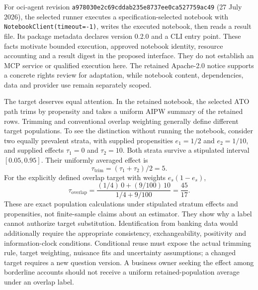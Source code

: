 For oci-agent revision
\texttt{a978030e2c69cddab235}\allowbreak\texttt{e8737ee0ca527759ac49}
(27 July 2026), the selected runner executes a specification-selected notebook
with \texttt{NotebookClient(timeout=-1)}, writes the executed notebook, then
reads a result file. Its package metadata declares version 0.2.0 and a CLI
entry point. These facts motivate bounded execution, approved notebook
identity, resource accounting and a result digest in the proposed interface.
They do not establish an MCP service or qualified execution here. The retained
Apache-2.0 notice supports a concrete rights review for adaptation, while
notebook content, dependencies, data and provider use remain separately
scoped.~\citep{exec13_data_oci_code,exec25_agents_choice}

The target deserves equal attention. In the retained notebook, the selected
ATO path trims by propensity and takes a uniform AIPW summary of the retained
rows. Trimming and conventional overlap weighting generally define different
target populations. To see the distinction without running the notebook,
consider two equally prevalent strata, with supplied propensities $e_1=1/2$
and $e_2=1/10$, and supplied effects $\tau_1=0$ and $\tau_2=10$. Both strata
survive a stipulated interval $[0.05,0.95]$. Their uniformly averaged effect is
\begin{equation}
 \tau_{\mathrm{trim}}=(\tau_1+\tau_2)/2=5.
\end{equation}
For the explicitly defined overlap target with weights $e_s(1-e_s)$,
\begin{equation}
 \tau_{\mathrm{overlap}}=
 \frac{(1/4)\,0+(9/100)\,10}{1/4+9/100}=\frac{45}{17}.
\end{equation}
These are exact population calculations under stipulated stratum effects and
propensities, not finite-sample claims about an estimator. They show why a
label cannot authorize target substitution. Identification from banking data
would additionally require the appropriate consistency, exchangeability,
positivity and information-clock conditions. Conditional reuse must expose
the actual trimming rule, target weighting, nuisance fits and uncertainty
assumptions; a changed target requires a new question version. A business
owner seeking the effect among borderline accounts should not receive a
uniform retained-population average under an overlap label.~\citep{exec13_data_oci_code,exec25_agents_choice}

